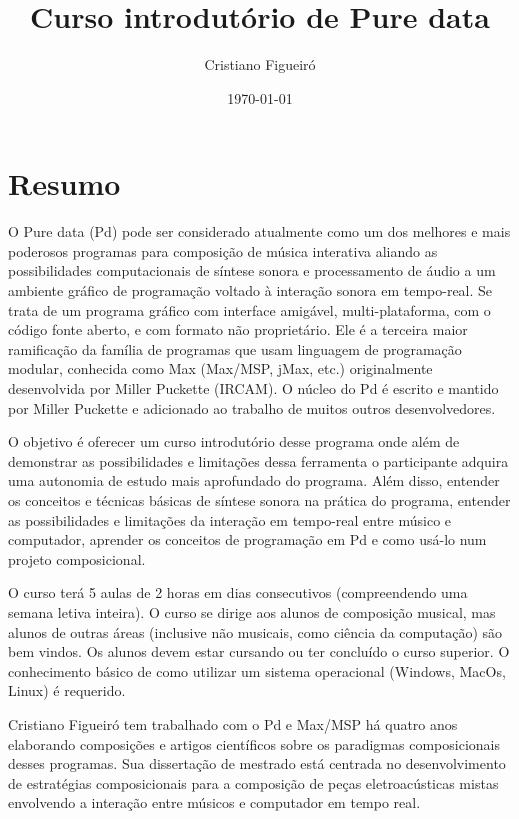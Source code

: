 \documentclass{article}
\title{Curso introdutório de Pure data }
\author{Cristiano Figueiró }
\begin{document}
\date{\today}

\maketitle
\section{ Resumo}

       O Pure data (Pd) pode ser considerado atualmente como um dos melhores e mais
poderosos programas para composição de música interativa aliando as possibilidades
computacionais de síntese sonora e processamento de áudio a um ambiente gráfico de
programação voltado à interação sonora em tempo-real. Se trata de um programa gráfico
com interface amigável, multi-plataforma, com o código fonte aberto, e com formato não
proprietário. Ele é a terceira maior ramificação da família de programas que usam
linguagem de programação modular, conhecida como Max (Max/MSP, jMax, etc.)
originalmente desenvolvida por Miller Puckette (IRCAM). O núcleo do Pd é escrito e
mantido por Miller Puckette e adicionado ao trabalho de muitos outros desenvolvedores.
      

 O objetivo é oferecer um curso introdutório desse programa onde além de
demonstrar as possibilidades e limitações dessa ferramenta o participante adquira uma
autonomia de estudo mais aprofundado do programa. Além disso, entender os conceitos e
técnicas básicas de síntese sonora na prática do programa, entender as possibilidades e
limitações da interação em tempo-real entre músico e computador, aprender os conceitos
de programação em Pd e como usá-lo num projeto composicional.
      

 O curso terá 5 aulas de 2 horas em dias consecutivos (compreendendo uma semana
letiva inteira). O curso se dirige aos alunos de composição musical, mas alunos de outras
áreas (inclusive não musicais, como ciência da computação) são bem vindos. Os alunos
devem estar cursando ou ter concluído o curso superior. O conhecimento básico de como
utilizar um sistema operacional (Windows, MacOs, Linux) é requerido.
      

 Cristiano Figueiró tem trabalhado com o Pd e Max/MSP há quatro anos
elaborando composições e artigos científicos sobre os paradigmas composicionais desses
programas. Sua dissertação de mestrado está centrada no desenvolvimento de estratégias
composicionais para a composição de peças eletroacústicas mistas envolvendo a
interação entre músicos e computador em tempo real.
\end{document}
